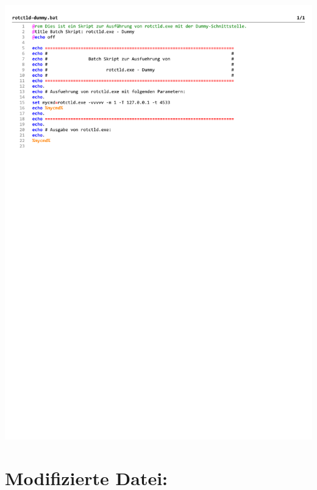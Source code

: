 \begin{center}
	\includegraphics[width=1\textwidth]{./appendicies/rotctld-dummy}
\end{center}


\chapter{Modifizierte Datei: }
\label{chap:hamlibmodification}

